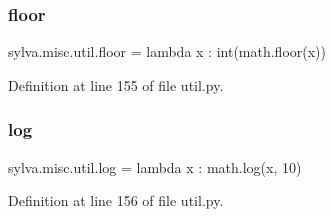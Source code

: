 \subsubsection{\texorpdfstring{floor}{floor}}
{\footnotesize\ttfamily sylva.\+misc.\+util.\+floor = lambda x \+: int(math.\+floor(x))}



Definition at line 155 of file util.\+py.

\mbox{\label{namespacesylva_1_1misc_1_1util_ab3731c524403f8c49cdb518af558d408}} 
\subsubsection{\texorpdfstring{log}{log}}
{\footnotesize\ttfamily sylva.\+misc.\+util.\+log = lambda x \+: math.\+log(x, 10)}



Definition at line 156 of file util.\+py.

